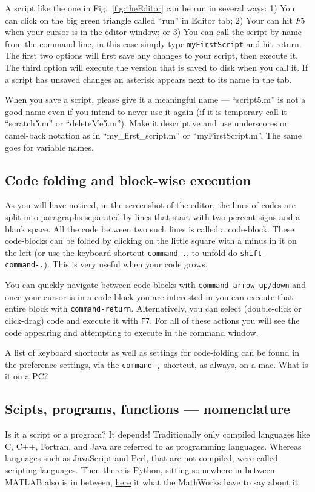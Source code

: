 A script like the one in Fig.~\ref{fig:theEditor} can be run in several ways: 1) You can click on the big green triangle called ``run'' in Editor tab; 2) Your can hit $F5$ when your cursor is in the editor window; or 3) You can call the script by name from the command line, in this case simply type \lstinline{myFirstScript} and hit return.  The first two options will first save any changes to your script, then execute it. The third option will execute the version that is saved to disk when you call it.  If a script has unsaved changes an asterisk appears next to its name in the tab.

When you save a script, please give it a meaningful name --- ``script5.m'' is not a good name even if you intend to never use it again (if it is temporary call it ``scratch5.m'' or ``deleteMe5.m''). Make it descriptive and use underscores or camel-back notation as in ``my\_first\_script.m'' or ``myFirstScript.m''. The same goes for variable names.

\subsection{Code folding and block-wise execution}
As you will have noticed, in the screenshot of the editor, the lines of codes are split into paragraphs separated by lines that start with two percent signs and a blank space.  All the code between two such lines is called a code-block.  These code-blocks can be folded by clicking on the little square with a minus in it on the left (or use the keyboard shortcut \lstinline{command-.}, to unfold do \lstinline{shift-command-.}). This is very useful when your code grows.

You can quickly navigate between code-blocks with \lstinline{command-arrow-up/down} and once your cursor is in a code-block you are interested in you can execute that entire block with \lstinline{command-return}.  Alternatively, you can select (double-click or click-drag) code and execute it with \lstinline{F7}.  For all of these actions you will see the code appearing and attempting to execute in the command window.

A list of keyboard shortcuts as well as settings for code-folding can be found in the preference settings, via the \lstinline{command-,} shortcut, as always, on a mac.  What is it on a PC?

\subsection{Scipts, programs, functions --- nomenclature}
Is it a script or a program?  It depends!
Traditionally only compiled languages like C, C++, Fortran, and Java are referred to as programming languages.
Whereas languages such as JavaScript and Perl, that are not compiled, were called scripting languages. 
Then there is Python, sitting somewhere in between.
MATLAB also is in between, \href{http://ch.mathworks.com/help/matlab/matlab_prog/scripts-and-functions.html}{here} it what the MathWorks have to say about it

